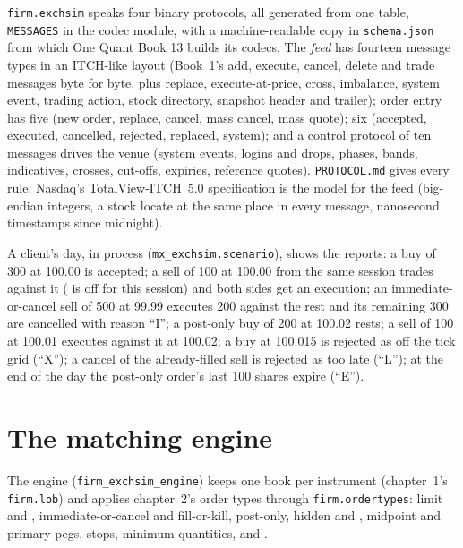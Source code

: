 \texttt{firm.exchsim} speaks four binary protocols, all generated from one table, \texttt{MESSAGES} in the codec module, with a machine-readable copy
in \texttt{schema.json} from which One Quant Book 13 builds its codecs. The \emph{feed} has fourteen message types in an ITCH-like layout (Book~1's add,
execute, cancel, delete and trade messages byte for byte, plus replace, execute-at-price, cross, imbalance, system event, trading action,
stock directory, snapshot header and trailer); order entry has five (new order, replace, cancel, mass cancel, mass quote);  six (accepted, executed,
cancelled, rejected, replaced, system); and a control protocol of ten messages drives the venue (system events, logins and drops, phases, bands,
indicatives, crosses, cut-offs, expiries, reference quotes). \texttt{PROTOCOL.md} gives every rule; Nasdaq's TotalView-ITCH~5.0 specification is the model for the
feed (big-endian integers, a stock locate at the same place in every message, nanosecond timestamps since midnight).

A client's day, in process (\texttt{mx\_exchsim.scenario}), shows the reports: a buy of 300 at 100.00 is accepted; a sell of 100 at 100.00 from the
same session trades against it ( is off for this session) and both sides get an execution; an immediate-or-cancel sell of 500 at
99.99 executes 200 against the rest and its remaining 300 are cancelled with reason ``I''; a post-only buy of 200 at 100.02 rests; a sell of 100 at
100.01 executes against it at 100.02; a buy at 100.015 is rejected as off the tick grid (``X''); a cancel of the already-filled sell is rejected as too
late (``L''); at the end of the day the post-only order's last 100 shares expire (``E'').

\section{The matching engine}

The engine (\texttt{firm\_exchsim\_engine}) keeps one book per instrument (chapter~1's \texttt{firm.lob}) and applies chapter~2's order types through
\texttt{firm.ordertypes}: limit and , immediate-or-cancel and fill-or-kill, post-only, hidden and , midpoint and primary pegs,
stops, minimum quantities, and .

